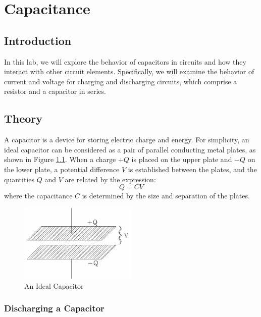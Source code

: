 \chapter{Capacitance}

\section{Introduction}

In this lab, we will explore the behavior of capacitors in circuits and how they interact with other circuit elements. Specifically, we will examine the behavior of current and voltage for charging and discharging  circuits, which comprise a resistor and a capacitor in series.

\section{Theory}

A capacitor is a device for storing electric charge and energy. For simplicity, an ideal capacitor can be considered as a pair of parallel conducting metal plates, as shown in Figure \ref{fig:capacitor}. When a charge $+Q$ is placed on the upper plate and $-Q$ on the lower plate, a potential difference $V$ is established between the plates, and the quantities $Q$ and $V$ are related by the expression:
\begin{equation}
    Q = CV
\end{equation}
where the capacitance $C$ is determined by the size and separation of the plates.

\begin{figure}[h]
    \begin{center}
        \includegraphics[width=0.5\textwidth]{./Exp3/pic/image1.png}
    \end{center}
    \caption{An Ideal Capacitor}
    \label{fig:capacitor}
\end{figure}

\subsection{Discharging a Capacitor}

